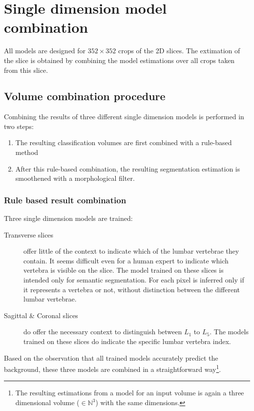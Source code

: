 
\chapter{Single dimension model combination\label{seq:combination}}

All models are designed for $352 \times 352$ crops of the 2D slices.
The extimation of the slice is obtained by combining the model estimations over all crops taken from this slice.

\section{Volume combination procedure}

Combining the results of three different single dimension models is performed in two steps:
\begin{enumerate}
    \item The resulting classification volumes are first combined with a rule-based method
    \item After this rule-based combination, the resulting segmentation estimation is smoothened with a morphological filter.
\end{enumerate}

\subsection{Rule based result combination}
Three single dimension models are trained:
\begin{description}
    \item[Transverse slices] offer little of the context to indicate which of the lumbar vertebrae they contain. 
    It seems difficult even for a human expert to indicate which vertebra is visible on the slice.
    The model trained on these slices is intended only for semantic segmentation.
    For each pixel is inferred only if it represents a vertebra or not, without distinction between the different lumbar vertebrae. 
    \item[Sagittal \& Coronal slices] do offer the necessary context to distinguish between $L_1$ to $L_5$. 
    The models trained on these slices do indicate the specific lumbar vertebra index. 
\end{description}

Based on the observation that all trained models accurately predict the background, these three models are combined in a straightforward way\footnote{
    The resulting estimations from a model for an input volume is again a three dimensional volume ($\in \mathbb{N}^3$) with the same dimensions.
}.

